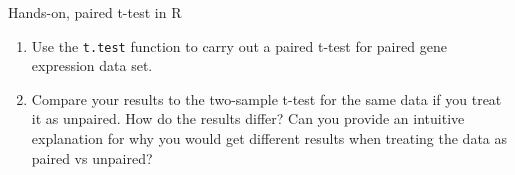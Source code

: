 \documentclass[presentation]{beamer}
\begin{document}
\begin{frame}[fragile,label={sec:org418bda3}]{Hands-on, paired t-test in R}
 \begin{enumerate}
\item Use the \texttt{t.test} function to carry out a paired t-test for paired gene expression data set.
\item Compare your results to the two-sample t-test for the same data if you treat it as unpaired. How do the results differ?  Can you provide an intuitive explanation for why you would get different results when treating the data as paired vs unpaired?
\end{enumerate}
\end{frame}
\end{document}
